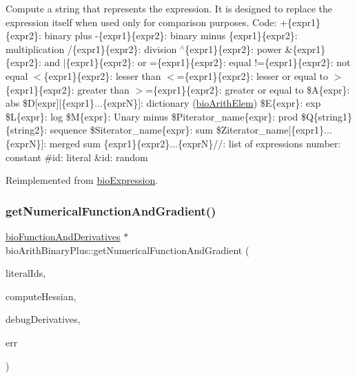 Compute a string that represents the expression. It is designed to replace the expression itself when used only for comparison purposes. Code\+: +\{expr1\}\{expr2\}\+: binary plus -\/\{expr1\}\{expr2\}\+: binary minus \{expr1\}\{expr2\}\+: multiplication /\{expr1\}\{expr2\}\+: division $^\wedge$\{expr1\}\{expr2\}\+: power \&\{expr1\}\{expr2\}\+: and $\vert$\{expr1\}\{expr2\}\+: or =\{expr1\}\{expr2\}\+: equal !=\{expr1\}\{expr2\}\+: not equal $<$\{expr1\}\{expr2\}\+: lesser than $<$=\{expr1\}\{expr2\}\+: lesser or equal to $>$\{expr1\}\{expr2\}\+: greater than $>$=\{expr1\}\{expr2\}\+: greater or equal to \$A\{expr\}\+: abs \$D\mbox{[}expr\mbox{]}\mbox{[}\{expr1\}...\{exprN\}\mbox{]}\+: dictionary (\hyperlink{classbio_arith_elem}{bio\+Arith\+Elem}) \$E\{expr\}\+: exp \$L\{expr\}\+: log \$M\{expr\}\+: Unary minus \$\+Piterator\+\_\+name\{expr\}\+: prod \$Q\{string1\}\{string2\}\+: sequence \$\+Siterator\+\_\+name\{expr\}\+: sum \$\+Ziterator\+\_\+name\mbox{[}\{expr1\}...\{exprN\}\mbox{]}\+: merged sum \{expr1\}\{expr2\}...\{exprN\}//\+: list of expressions number\+: constant \#id\+: literal \&id\+: random 

Reimplemented from \hyperlink{classbio_expression_a3e4b4dca58dbbc6f0e411b30eb3f60b4}{bio\+Expression}.

\mbox{\label{classbio_arith_binary_plus_a17d6b61d7dd58d5c03c087ddc7054632}} 
\subsubsection{\texorpdfstring{get\+Numerical\+Function\+And\+Gradient()}{getNumericalFunctionAndGradient()}}
{\footnotesize\ttfamily \hyperlink{classbio_function_and_derivatives}{bio\+Function\+And\+Derivatives} $\ast$ bio\+Arith\+Binary\+Plus\+::get\+Numerical\+Function\+And\+Gradient (\begin{DoxyParamCaption}\item[{vector$<$ pat\+U\+Long $>$}]{literal\+Ids,  }\item[{pat\+Boolean}]{compute\+Hessian,  }\item[{pat\+Boolean}]{debug\+Derivatives,  }\item[{pat\+Error $\ast$\&}]{err }\end{DoxyParamCaption})\hspace{0.3cm}{\ttfamily [virtual]}}

